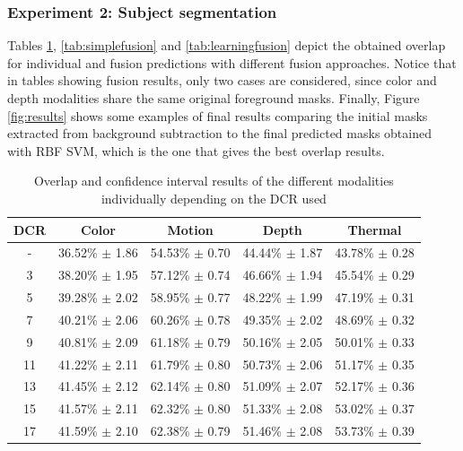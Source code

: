 \documentclass[10pt,twocolumn,letterpaper]{article}
\begin{document}
\subsubsection{Experiment 2: Subject segmentation }

Tables \ref{tab:individual}, \ref{tab:simplefusion} and \ref{tab:learningfusion} depict the obtained overlap for individual and fusion predictions with different fusion approaches. Notice that in tables showing fusion results, only two cases are considered, since color and depth modalities share the same original foreground masks. Finally, Figure \ref{fig:results} shows some examples of final results comparing the initial masks extracted from background subtraction to the final predicted masks obtained with RBF SVM, which is the one that gives the best overlap results.

\begin{table}[ht]
\caption{Overlap and confidence interval results of the different modalities individually depending on the DCR used}
\begin{center}
\begin{tabular}{c|c|c|c|c}
    \hline
    DCR & Color & Motion & Depth & Thermal \\
    \hline
    -  & 36.52\% $\pm$ 1.86 & 54.53\% $\pm$ 0.70 & 44.44\% $\pm$ 1.87 & 43.78\% $\pm$ 0.28 \\
    3 & 38.20\% $\pm$  1.95 & 57.12\% $\pm$ 0.74 & 46.66\% $\pm$ 1.94 & 45.54\% $\pm$ 0.29 \\
    5 & 39.28\% $\pm$ 2.02 & 58.95\% $\pm$ 0.77 & 48.22\% $\pm$ 1.99 & 47.19\% $\pm$ 0.31 \\
    7 & 40.21\% $\pm$ 2.06 & 60.26\% $\pm$ 0.78 & 49.35\% $\pm$ 2.02 & 48.69\% $\pm$ 0.32 \\
    9 & 40.81\% $\pm$ 2.09 & 61.18\% $\pm$ 0.79 & 50.16\% $\pm$ 2.05 & 50.01\% $\pm$ 0.33 \\
    11 & 41.22\% $\pm$ 2.11 & 61.79\% $\pm$ 0.80 & 50.73\% $\pm$ 2.06 & 51.17\% $\pm$ 0.35 \\
    13 & 41.45\% $\pm$ 2.12 & 62.14\% $\pm$ 0.80 & 51.09\% $\pm$ 2.07 & 52.17\% $\pm$ 0.36 \\
    15 & 41.57\% $\pm$ 2.11 & 62.32\% $\pm$ 0.80 & 51.33\% $\pm$ 2.08 & 53.02\% $\pm$ 0.37 \\
    17 & 41.59\% $\pm$ 2.10 & 62.38\% $\pm$ 0.79 & 51.46\% $\pm$ 2.08 & 53.73\% $\pm$ 0.39 \\
\end{tabular}
\end{center}
\label{tab:individual}
\end{table}
\end{document}

